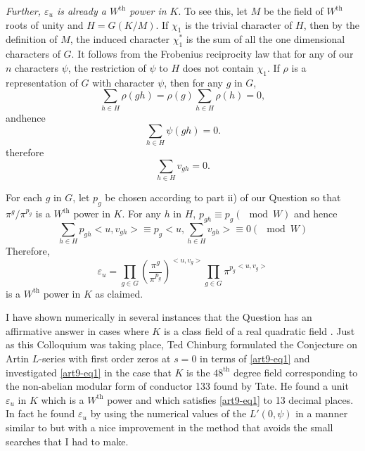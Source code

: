\textit{Further, $\varepsilon_u$ is already a $W^{\text{th}}$ power in $K$}. To see this, let $M$ be the field of $W^{\text{th}}$ roots of unity and $H = G(K/M)$. If $\chi_1$ is the trivial character of $H$, then by the definition of $M$, the induced character $\chi^\ast_1$ is the sum of all the one dimensional characters of $G$. It follows from the Frobenius reciprocity law that for any of our $n$ characters $\psi$, the restriction of $\psi$ to $H$ does not contain $\chi_1$. If $\rho$ is a representation of $G$ with character $\psi$, then for any $g$ in $G$,
$$
\sum\limits_{h \in H} \rho (gh) =\rho (g) \sum\limits_{h \in H} \rho (h) = 0,
$$
and\pageoriginale hence 
$$
\sum\limits_{h \in H} \psi (gh ) = 0.
$$
therefore 
$$
\sum\limits_{h \in H} v_{gh} = 0.
$$

For each $g$ in $G$, let $p_g$ be chosen according to part ii) of our Question so that $\pi^g/\pi^{p_g}$ is a $W^{\text{th}}$ power in $K$. For any $h$ in $H$, $p_{gh} \equiv p_g (\mod W)$ and hence 
$$
\sum\limits_{h \in H} p_{gh} < u, v_{gh}> \equiv p_g < u, \sum\limits_{h \in H} v_{gh} > \equiv 0 (\mod W)
$$
Therefore, 
$$
\varepsilon_u = \prod\limits_{g \in G} \left(\frac{\pi^g}{\pi^{p_g}} \right)^{<u, v_g>} \prod\limits_{g \in G} {\pi^{p_g}}^{<u, v_g>}
$$
is a $W^{\text{th}}$ power in $K$ as claimed.

I have shown numerically in several instances that the Question has an affirmative answer in cases where $K$ is a class field of a real quadratic field \cite[III, IV]{art9-6}. Just as this Colloquium was taking place, Ted Chinburg \cite{art9-1} formulated the Conjecture on Artin $L$-series with first order zeros at $s =0$ in terms of \eqref{art9-eq1} and  investigated \eqref{art9-eq1} in the case that $K$ is the $48^{\text{th}}$ degree field corresponding to the non-abelian modular form of conductor 133 found by Tate. He found a unit $\varepsilon_u$ in $K$ which is a $W^{\text{th}}$ power and which satisfies \eqref{art9-eq1} to 13 decimal places. In fact he found $\varepsilon_u$ by using the numerical values  of the $L' (0, \psi)$ in a manner similar to \cite[II]{art9-6} but with a nice improvement in the method that avoids the small searches that I had to make.

